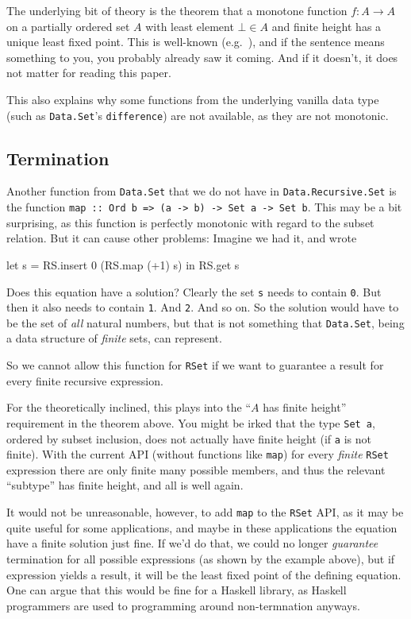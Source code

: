 \documentclass[manuscript,anonymous,screen,acmsmall]{acmart}
\begin{document}
The underlying bit of theory is the theorem that a monotone function $f : A \to A$ on a partially ordered set $A$ with least element $\bot \in A$ and finite height has a unique least fixed point. This is well-known (e.g.\ \citet{lazyleast}), and if the sentence means something to you, you probably already saw it coming. And if it doesn't, it does not matter for reading this paper.

This also explains why some functions from the underlying vanilla data type (such as \verb|Data.Set|'s \verb|difference|) are not available, as they are not monotonic.

\subsection{Termination}

Another function from \verb|Data.Set| that we do not have in \verb|Data.Recursive.Set| is the function \verb|map :: Ord b => (a -> b) -> Set a -> Set b|. This may be a bit surprising, as this function is perfectly monotonic with regard to the subset relation. But it can cause other problems: Imagine we had it, and wrote
\begin{code}
let s = RS.insert 0 (RS.map (+1) s) in RS.get s
\end{code}
Does this equation have a solution? Clearly the set \verb|s| needs to contain \verb|0|. But then it also needs to contain \verb|1|. And \verb|2|. And so on. So the solution would have to be the set of \emph{all} natural numbers, but that is not something that \verb|Data.Set|, being a data structure of \emph{finite} sets, can represent.

So we cannot allow this function for \verb|RSet| if we want to guarantee a result for every finite recursive expression.

For the theoretically inclined, this plays into the “$A$ has finite height” requirement in the theorem above. You might be irked that the type \verb|Set a|, ordered by subset inclusion, does not actually have finite height (if \verb|a| is not finite). With the current API (without functions like \verb|map|) for every \emph{finite} \verb|RSet| expression there are only finite many possible members, and thus the relevant “subtype” has finite height, and all is well again.

It would not be unreasonable, however, to add \verb|map| to the \verb|RSet| API, as it may be quite useful for some applications, and maybe in these applications the equation have a finite solution just fine. If we'd do that, we could no longer \emph{guarantee} termination for all possible expressions (as shown by the example above), but if expression yields a result, it will be the least fixed point of the defining equation. One can argue that this would be fine for a Haskell library, as Haskell programmers are used to programming around non-termnation anyways.
\end{document}
